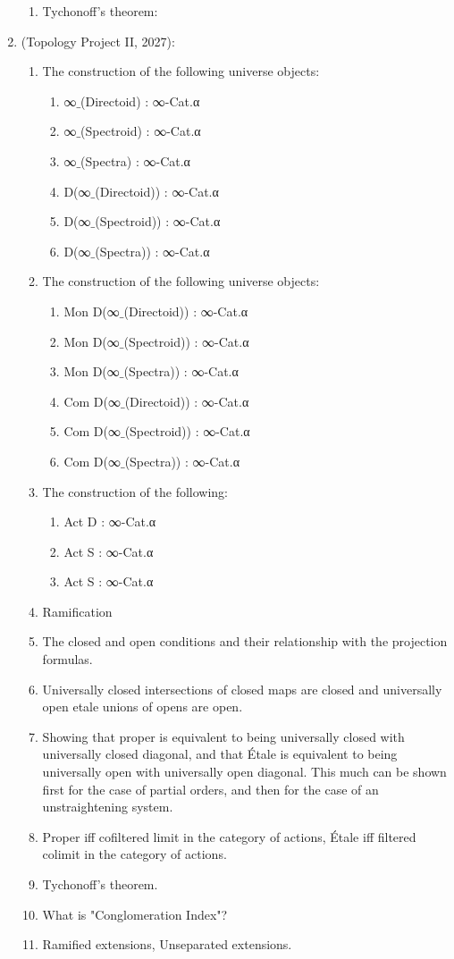 \documentclass{book}
\begin{document}
\begin{enumerate}
\begin{enumerate}
\item Tychonoff's theorem: 
\end{enumerate}
\item (Topology Project II, 2027):
\begin{enumerate}
\item The construction of the following universe objects:
\begin{enumerate}
\item ∞${}\_$(Directoid) : ∞-Cat.α
\item ∞${}\_$(Spectroid) : ∞-Cat.α
\item ∞${}\_$(Spectra) : ∞-Cat.α
\item D(∞${}\_$(Directoid)) : ∞-Cat.α
\item D(∞${}\_$(Spectroid)) : ∞-Cat.α
\item D(∞${}\_$(Spectra)) : ∞-Cat.α
\end{enumerate}
\item The construction of the following universe objects:
\begin{enumerate}
\item Mon D(∞${}\_$(Directoid)) : ∞-Cat.α
\item Mon D(∞${}\_$(Spectroid)) : ∞-Cat.α
\item Mon D(∞${}\_$(Spectra)) : ∞-Cat.α
\item Com D(∞${}\_$(Directoid)) : ∞-Cat.α
\item Com D(∞${}\_$(Spectroid)) : ∞-Cat.α
\item Com D(∞${}\_$(Spectra)) : ∞-Cat.α
\end{enumerate}
\item The construction of the following:
\begin{enumerate}
\item Act D : ∞-Cat.α 
\item Act S : ∞-Cat.α
\item Act S : ∞-Cat.α
\end{enumerate}
\item Ramification 
\item The closed and open conditions and their relationship with the projection formulas.
\item Universally closed intersections of closed maps are closed and universally open etale unions of opens are open.
\item Showing that proper is equivalent to being universally closed with universally closed diagonal, and that Étale is equivalent to being universally open with universally open diagonal. This much can be shown first for the case of partial orders, and then for the case of an unstraightening system.
\item Proper iff cofiltered limit in the category of actions, Étale iff filtered colimit in the category of actions.
\item Tychonoff's theorem.
\item What is "Conglomeration Index"?
\item Ramified extensions, Unseparated extensions.
\end{enumerate}
\end{enumerate}
\end{document}
